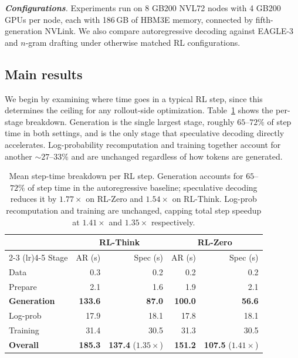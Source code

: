 \documentclass[11pt, logo, onecolumn, copyright, colorlinks=true, allcolors=blue]{nvidiatechreport}
\begin{document}
\emph{\textbf{Configurations}.}
Experiments run on 8 GB200 NVL72 nodes with 4 GB200 GPUs per node, each with 186\,GB of HBM3E memory, connected by fifth-generation NVLink. We also compare autoregressive decoding against EAGLE-3 and $n$-gram drafting under otherwise matched RL configurations.

\subsection{Main results}
\label{sub:main_results}

We begin by examining where time goes in a typical RL step, since this determines the ceiling for any rollout-side optimization. Table~\ref{tab:main_step_time_breakdown} shows the per-stage breakdown. Generation is the single largest stage, roughly $65$--$72\%$ of step time in both settings, and is the only stage that speculative decoding directly accelerates. Log-probability recomputation and training together account for another ${\sim}27$--$33\%$ and are unchanged regardless of how tokens are generated.

\begin{table}[ht]
  \centering
  \small
  \begin{tabular}{lrrrr}
  \toprule
  & \multicolumn{2}{c}{\textbf{RL-Think}} & \multicolumn{2}{c}{\textbf{RL-Zero}} \\
  \cmidrule(lr){2-3} \cmidrule(lr){4-5}
  Stage & AR (s) & Spec (s) & AR (s) & Spec (s) \\
  \midrule
  Data                 &   0.3 &   0.2 &   0.2 &   0.2 \\
  Prepare              &   2.1 &   1.6 &   1.9 &   2.1 \\
  \textbf{Generation}  & \textbf{133.6} & \textbf{87.0} & \textbf{100.0} & \textbf{56.6} \\
  Log-prob             &  17.9 &  18.1 &  17.8 &  18.1 \\
  Training             &  31.4 &  30.5 &  31.3 &  30.5 \\
  \midrule
  \textbf{Overall} & \textbf{185.3} & \textbf{137.4} ($1.35\times$) & \textbf{151.2} & \textbf{107.5} ($1.41\times$) \\
  \bottomrule
  \end{tabular}
  \caption{Mean step-time breakdown per RL step. Generation accounts for $65$--$72\%$ of step
  time in the autoregressive baseline; speculative decoding reduces it by $1.77\times$ on
  RL-Zero and $1.54\times$ on RL-Think. Log-prob recomputation and training are unchanged,
  capping total step speedup at $1.41\times$ and $1.35\times$ respectively.}
  \label{tab:main_step_time_breakdown}
\end{table}
\end{document}
